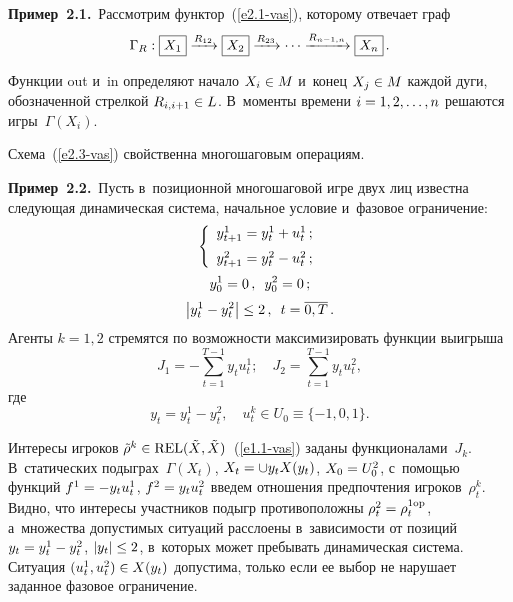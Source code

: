 \begin{multicols}{2}
    \smallskip
    
    \noindent
    \textbf{Пример~2.1.}\ Рассмотрим функтор~(\ref{e2.1-vas}), которому отвечает 
граф
    \begin{equation}
    \Gamma_R: \mbox{\fbox{$X_1$}} \xrightarrow{R_{12}} \mbox{\fbox{$X_2$}} 
\xrightarrow{R_{23}} \cdots \xrightarrow{R_{n-1,n}} \mbox{\fbox{$X_n$}}\,.
    \label{e2.3-vas}
    \end{equation}
    
    Функции out и~in определяют начало $X_i\hm\in M$ и~конец $X_j\hm\in M$ 
каж\-дой дуги, обозначенной стрелкой $R_{i,i+1}\hm\in L$. В~моменты времени 
$i\hm= 1,2,\ldots , n$ решаются игры~$\Gamma(X_i)$.
    
    Схема~(\ref{e2.3-vas}) свойственна многошаговым опе\-ра\-циям.
    
    \smallskip
    
    \noindent
    \textbf{Пример~2.2.}\ Пусть в~позиционной многошаговой игре двух лиц 
известна сле\-ду\-ющая динамическая сис\-те\-ма, начальное условие и~фазовое 
ограничение:
    \begin{gather*}
    \left\{
    \begin{array}{c}
    y_{t+1}^1 =y_t^1+u_t^1\,;\\[6pt]
    y_{t+1}^2 = y_t^2-u_t^2\,;
    \end{array}
    \right.\\[2pt]
    y_0^1 =0\,,\enskip y_0^2 =0\,;\\[2pt]
    \left\vert y_t^1 -y_t^2\right\vert \leq 2\,,\enskip t=\overline{0, T}\,.
    \end{gather*}
Агенты $k=1, 2$ стремятся по возможности максимизировать функции выигрыша
\begin{equation*}
J_1=-\sum\limits_{t=1}^{T-1} y_t u_t^1;\quad J_2= \sum\limits_{t=1}^{T-1} y_t u_t^2,
\end{equation*}
где
$$
y_t=y_t^1 - y_t^2,\quad u_t^k \in U_0\equiv \{ -1, 0, 1\}.
$$
    
    Интересы игроков $\tilde{\rho}^k \hm\in \mathrm{REL}( \tilde{X}, 
\tilde{X})$~(\ref{e1.1-vas}) заданы функционалами~$J_k$. В~статических 
подыг\-рах~$\Gamma(X_t)$, $X_t\hm= \cup y_t X(y_t)$, $X_0\hm= U_0^2$, с~по\-мощью 
функций $f^1\hm= -y_t u_t^1$, $f^2\hm= y_t u_t^2$ введем отношения предпочтения 
игроков~$\rho_t^k$. Видно, что интересы участников подыгр противоположны 
$\rho_t^2\hm= \rho_t^{1\mathrm{op}}$, а~множества допустимых ситуаций расслоены 
в~за\-ви\-си\-мости от позиций $y_t\hm= y_t^1\hm- y_t^2$, $\vert y_t\vert \hm\leq 2$, 
в~которых может пребывать динамическая сис\-те\-ма. Ситуация $(u_t^1, u_t^2)\hm\in 
X(y_t)$ допустима, только если ее выбор не нарушает заданное фазовое 
ограничение. 
    

\end{multicols}
